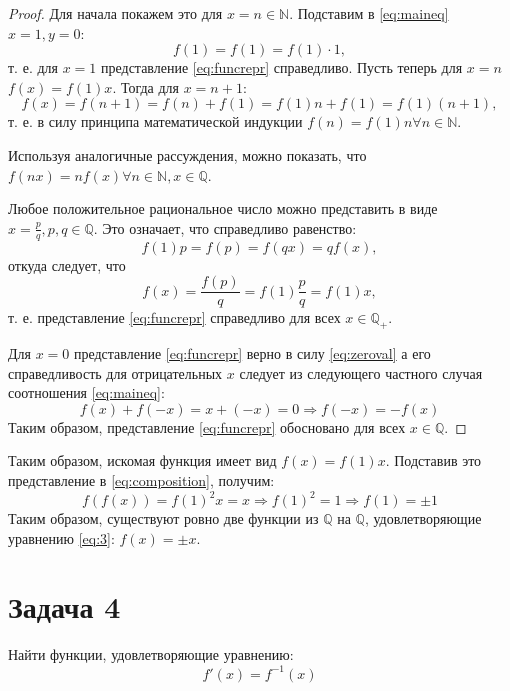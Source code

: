 \documentclass[11pt]{article}
\def\zall{\setcounter{lem}{0}\setcounter{cnsqnc}{0}\setcounter{th}{0}\setcounter{Cmt}{0}\setcounter{equation}{0}}
\newcounter{lem}\setcounter{lem}{0}
\newcounter{th}\setcounter{th}{0}
\newcounter{cnsqnc}\setcounter{cnsqnc}{0}
\newcounter{Cmt}\setcounter{Cmt}{0}
\begin{document}
\begin{proof}
Для начала покажем это для $x = n \in \mathbb{N}$. Подставим в \eqref{eq:maineq} $x = 1, y = 0$:
\begin{equation*}
f(1) = f(1) = f(1)\cdot1,
\end{equation*}
т. е. для $x = 1$ представление \eqref{eq:funcrepr} справедливо. Пусть теперь для $x = n$ $f(x) = f(1)x$. Тогда для $x = n + 1$:
\begin{equation*}
f(x) = f(n + 1) = f(n) + f(1) = f(1)n + f(1) = f(1)(n + 1),
\end{equation*}
т. е. в силу принципа математической индукции $f(n) = f(1)n \forall n \in \mathbb{N}$.

Используя аналогичные рассуждения, можно показать, что $f(nx) = nf(x) \forall n \in \mathbb{N}, x \in \mathbb{Q}$.

Любое положительное рациональное число можно представить в виде $x = \frac{p}q, p, q \in \mathbb{Q}$. Это означает, что справедливо равенство:
\begin{equation*}
f(1)p = f(p) = f(qx) = qf(x),
\end{equation*}
откуда следует, что
\begin{equation*}
f(x) = \frac{f(p)}q = f(1)\frac{p}q = f(1)x,
\end{equation*}
т. е. представление \eqref{eq:funcrepr} справедливо для всех $x \in \mathbb{Q}_{+}$.

Для $x = 0$ представление \eqref{eq:funcrepr} верно в силу \eqref{eq:zeroval} а его справедливость для отрицательных $x$ следует из следующего частного случая соотношения \eqref{eq:maineq}:
\begin{equation*}
f(x) + f(-x) = x + (-x) = 0 \Rightarrow f(-x) = -f(x)
\end{equation*}
Таким образом, представление \eqref{eq:funcrepr} обосновано для всех $x \in \mathbb{Q}$.
\end{proof}

Таким образом, искомая функция имеет вид $f(x) = f(1)x$. Подставив это представление в \eqref{eq:composition}, получим:
\begin{equation*}
f(f(x)) = f(1)^2x = x \Rightarrow f(1)^2 = 1 \Rightarrow f(1) = \pm1
\end{equation*}
Таким образом, существуют ровно две функции из $\mathbb{Q}$ на $\mathbb{Q}$, удовлетворяющие уравнению \eqref{eq:3}: $f(x) = \pm x$.
\pagebreak
\section{Задача 4}
\label{sec:org7fa8563}
\zall
Найти функции, удовлетворяющие уравнению:
\begin{equation}\label{eq:4}
f'(x) = f^{-1}(x)
\end{equation}
\end{document}
